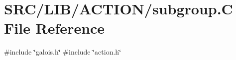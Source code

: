 \hypertarget{subgroup_8_c}{}\section{S\+R\+C/\+L\+I\+B/\+A\+C\+T\+I\+O\+N/subgroup.C File Reference}
\label{subgroup_8_c}
{\ttfamily \#include \char`\"{}galois.\+h\char`\"{}}\newline
{\ttfamily \#include \char`\"{}action.\+h\char`\"{}}\newline
